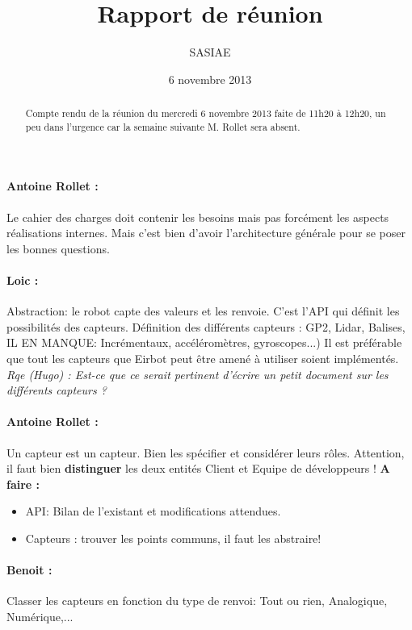 \documentclass[a4paper,10pt]{article}
\title{Rapport de réunion}           %
\author{SASIAE}
\date{6 novembre 2013}
\begin{document}
\maketitle                    %

\begin{abstract}
Compte rendu de la réunion du mercredi 6 novembre 2013 faite de 11h20 à 12h20, 
un peu dans l'urgence car la semaine suivante M. Rollet sera absent.
\end{abstract}

\paragraph{Antoine Rollet :}
Le cahier des charges doit contenir les besoins mais pas forcément les aspects réalisations internes.
Mais c'est bien d'avoir l'architecture générale pour se poser les bonnes questions.

\paragraph{Loic :}

Abstraction: le robot capte des valeurs et les renvoie.  C'est l'API qui définit les possibilités des capteurs.
Définition des différents capteurs : GP2, Lidar, Balises, IL EN MANQUE: Incrémentaux, accéléromètres, gyroscopes...)
Il est préférable que tout les capteurs que Eirbot peut être amené à utiliser soient implémentés.
\textit{Rqe (Hugo) : Est-ce que ce serait pertinent d'écrire un petit document sur les différents capteurs ? }

\paragraph{Antoine Rollet :}

Un capteur est un capteur.
Bien les spécifier et considérer leurs rôles.
Attention, il faut bien \textbf{distinguer} les deux entités Client et Equipe de développeurs !
\textbf{A faire :} 
\begin{itemize}
\item API: Bilan de l'existant et modifications attendues.
\item Capteurs : trouver les points communs, il faut les abstraire!
\end{itemize}

\paragraph{Benoit :}
Classer les capteurs en fonction du type de renvoi:
Tout ou rien, Analogique, Numérique,...
\end{document}
